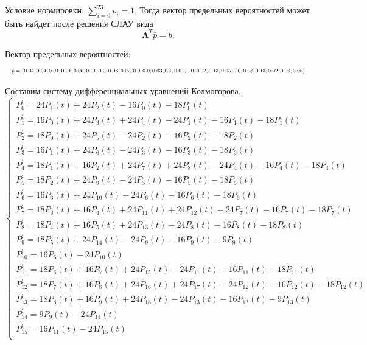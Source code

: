 Условие нормировки: $\sum\limits_{i=0}^{ 23 }p_i=1$.
Тогда вектор предельных вероятностей может быть найдет после решения СЛАУ вида $$\mathbf{\Lambda}^T\bar{p}=\bar{b}.$$

 Вектор предельных вероятностей:
 \[
    \resizebox{\textwidth}{!}{$
    \bar{p}= \left(  0.04, 0.04, 0.01, 0.01, 0.06, 0.01, 0.0, 0.08, 0.02, 0.0, 0.0, 0.03, 0.1, 0.01, 0.0, 0.02, 0.13, 0.05, 0.0, 0.08, 0.13, 0.02, 0.09, 0.05 \right)
    $}
\]

Составим систему дифференциальных уравнений Колмогорова.
\[
\begin{cases}
    P^\prime_{0} = 24P_{1} (t) +24P_{2} (t) -16P_{0} (t) -18P_{0} (t) \\ 
P^\prime_{1} = 16P_{0} (t) +24P_{3} (t) +24P_{4} (t) -24P_{1} (t) -16P_{1} (t) -18P_{1} (t) \\ 
P^\prime_{2} = 18P_{0} (t) +24P_{5} (t) -24P_{2} (t) -16P_{2} (t) -18P_{2} (t) \\ 
P^\prime_{3} = 16P_{1} (t) +24P_{6} (t) -24P_{3} (t) -16P_{3} (t) -18P_{3} (t) \\ 
P^\prime_{4} = 18P_{1} (t) +16P_{2} (t) +24P_{7} (t) +24P_{8} (t) -24P_{4} (t) -16P_{4} (t) -18P_{4} (t) \\ 
P^\prime_{5} = 18P_{2} (t) +24P_{9} (t) -24P_{5} (t) -16P_{5} (t) -18P_{5} (t) \\ 
P^\prime_{6} = 16P_{3} (t) +24P_{10} (t) -24P_{6} (t) -16P_{6} (t) -18P_{6} (t) \\ 
P^\prime_{7} = 18P_{3} (t) +16P_{4} (t) +24P_{11} (t) +24P_{12} (t) -24P_{7} (t) -16P_{7} (t) -18P_{7} (t) \\ 
P^\prime_{8} = 18P_{4} (t) +16P_{5} (t) +24P_{13} (t) -24P_{8} (t) -16P_{8} (t) -18P_{8} (t) \\ 
P^\prime_{9} = 18P_{5} (t) +24P_{14} (t) -24P_{9} (t) -16P_{9} (t) -9P_{9} (t) \\ 
P^\prime_{10} = 16P_{6} (t) -24P_{10} (t) \\ 
P^\prime_{11} = 18P_{6} (t) +16P_{7} (t) +24P_{15} (t) -24P_{11} (t) -16P_{11} (t) -18P_{11} (t) \\ 
P^\prime_{12} = 18P_{7} (t) +16P_{8} (t) +24P_{16} (t) +24P_{17} (t) -24P_{12} (t) -16P_{12} (t) -18P_{12} (t) \\ 
P^\prime_{13} = 18P_{8} (t) +16P_{9} (t) +24P_{18} (t) -24P_{13} (t) -16P_{13} (t) -9P_{13} (t) \\ 
P^\prime_{14} = 9P_{9} (t) -24P_{14} (t) \\ 
P^\prime_{15} = 16P_{11} (t) -24P_{15} (t) \\ 

\end{cases}\]

